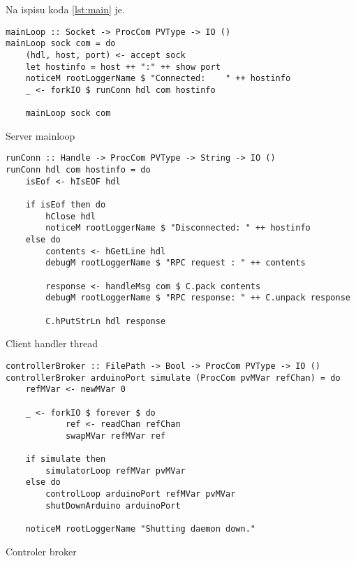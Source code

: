Na ispisu koda \ref{lst:main} je.

\begin{listing}[H]
\centering
\begin{verbatim}
mainLoop :: Socket -> ProcCom PVType -> IO ()
mainLoop sock com = do
    (hdl, host, port) <- accept sock
    let hostinfo = host ++ ":" ++ show port
    noticeM rootLoggerName $ "Connected:    " ++ hostinfo
    _ <- forkIO $ runConn hdl com hostinfo

    mainLoop sock com
\end{verbatim}
\caption{Server mainloop}
\label{lst:mainloop}
\end{listing}

\begin{listing}[H]
\centering
\begin{verbatim}
runConn :: Handle -> ProcCom PVType -> String -> IO ()
runConn hdl com hostinfo = do
    isEof <- hIsEOF hdl

    if isEof then do
        hClose hdl
        noticeM rootLoggerName $ "Disconnected: " ++ hostinfo
    else do
        contents <- hGetLine hdl
        debugM rootLoggerName $ "RPC request : " ++ contents

        response <- handleMsg com $ C.pack contents
        debugM rootLoggerName $ "RPC response: " ++ C.unpack response

        C.hPutStrLn hdl response
\end{verbatim}
\caption{Client handler thread}
\label{lst:client handler}
\end{listing}

\begin{listing}[H]
\centering
\begin{verbatim}
controllerBroker :: FilePath -> Bool -> ProcCom PVType -> IO ()
controllerBroker arduinoPort simulate (ProcCom pvMVar refChan) = do
    refMVar <- newMVar 0

    _ <- forkIO $ forever $ do
            ref <- readChan refChan
            swapMVar refMVar ref

    if simulate then
        simulatorLoop refMVar pvMVar
    else do
        controlLoop arduinoPort refMVar pvMVar
        shutDownArduino arduinoPort

    noticeM rootLoggerName "Shutting daemon down."
\end{verbatim}
\caption{Controler broker}
\label{lst:controler broker}
\end{listing}


